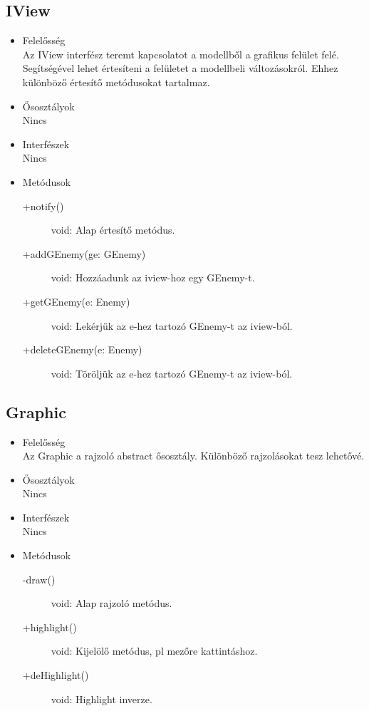 \subsection{IView}
\begin{itemize}
\item Felelősség\\
Az IView interfész teremt kapcsolatot a modellből a grafikus felület felé. Segítségével lehet értesíteni a felületet a modellbeli változásokról. Ehhez különböző értesítő metódusokat tartalmaz.
\item Ősosztályok\\
Nincs
\item Interfészek\\
Nincs
\item Metódusok\\
	\begin{description}
		\item[+notify()] void: Alap értesítő metódus.
		\item[+addGEnemy(ge: GEnemy)] void: Hozzáadunk az iview-hoz egy GEnemy-t.
		\item[+getGEnemy(e: Enemy)] void: Lekérjük az e-hez tartozó GEnemy-t az iview-ból.
		\item[+deleteGEnemy(e: Enemy)] void: Töröljük az e-hez tartozó GEnemy-t az iview-ból.
	\end{description}
\end{itemize}

\subsection{Graphic}
\begin{itemize}
\item Felelősség\\
Az Graphic a rajzoló abstract ősosztály. Különböző rajzolásokat tesz lehetővé.
\item Ősosztályok\\
Nincs
\item Interfészek\\
Nincs
\item Metódusok\\
	\begin{description}
		\item[-draw()] void: Alap rajzoló metódus.
		\item[+highlight()] void: Kijelölő metódus, pl mezőre kattintáshoz.
		\item[+deHighlight()] void: Highlight inverze.
	\end{description}
\end{itemize}

